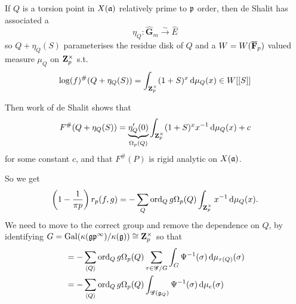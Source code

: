 \begin{frame}
If \(Q\) is a torsion point in \(X(\mathfrak{a})\) relatively prime to \(\mathfrak{p}\) order, then de Shalit has associated a%
\begin{equation*}
    \eta_Q \colon \widehat {\mathbf G}_m \xrightarrow\sim \widehat E
\end{equation*}
so \(Q + \eta_Q(S)\) parameterises the residue disk of \(Q\) and a \(W = W(\overline {\mathbf F}_p)\) valued measure \(\mu_Q\) on \(\mathbf{Z}_p^\times\) s.t.%
\begin{equation*}
\log (f)^\# (Q+ \eta_Q(S)) = \int_{\mathbf{Z}_p^\times} (1+S)^x \mathop{}\!\mathrm{d} \mu_Q(x) \in W[[ S]]
\end{equation*}

\end{frame}

\begin{frame}
Then work of de Shalit shows that%
\begin{equation*}
F^\# (Q+ \eta_Q(S)) = \underbrace{\eta'_Q(0)}_{\Omega_p(Q)} \int_{\mathbf{Z}_p^\times} (1+S)^x x^{-1} \mathop{}\!\mathrm{d} \mu_Q(x) + c
\end{equation*}
for some constant  \(c\), and that \(F^\# (P)\) is rigid analytic on \(X(\mathfrak{a})\).%
\pause

So we get%
\begin{equation*}
\left( 1 - \frac{1}{\pi p } \right) r_p(f,g) = - \sum_Q \operatorname{ord}_Q g \Omega_p(Q) \int_{\mathbf{Z}_p^\times } x^{-1} \mathop{}\!\mathrm{d} \mu_Q(x)\text{.}
\end{equation*}
We need to move to the correct group and remove the dependence on \(Q\),
\pause
by identifying \(G = \operatorname{Gal}(\kappa(\mathfrak{g} \mathfrak{p}^\infty)/\kappa(\mathfrak{g})) \cong \mathbf{Z}_p^\times\) so that
\begin{align*}
&= - \sum_{\langle Q\rangle} \operatorname{ord}_Q g \Omega_p(Q) \sum_{\tau \in \mathscr G/ G}  \int_{G} \Psi ^{-1}(\sigma) \mathop{}\!\mathrm{d} \mu_{\tau (Q)}(\sigma)\\
&= - \sum_{\langle Q\rangle} \operatorname{ord}_Q g \Omega_p(Q) \int_{\mathscr G (\mathfrak{g}_Q)} \Psi ^{-1} (\sigma) \mathop{}\!\mathrm{d} \mu_e(\sigma)
\end{align*}

\end{frame}

